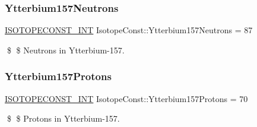 \subsubsection{\texorpdfstring{Ytterbium157\+Neutrons}{Ytterbium157Neutrons}}
{\footnotesize\ttfamily \mbox{\hyperlink{group___isotope_const-_macros_ga5f18360b3e99483a35c32d789e62621c}{I\+S\+O\+T\+O\+P\+E\+C\+O\+N\+S\+T\+\_\+\+I\+NT}} Isotope\+Const\+::\+Ytterbium157\+Neutrons = 87}

\$ \$ Neutrons in Ytterbium-\/157. \mbox{\label{group___isotope_const-_ytterbium-_yb157_ga85c7cca72b2035565322da9c07930e69}} 
\subsubsection{\texorpdfstring{Ytterbium157\+Protons}{Ytterbium157Protons}}
{\footnotesize\ttfamily \mbox{\hyperlink{group___isotope_const-_macros_ga5f18360b3e99483a35c32d789e62621c}{I\+S\+O\+T\+O\+P\+E\+C\+O\+N\+S\+T\+\_\+\+I\+NT}} Isotope\+Const\+::\+Ytterbium157\+Protons = 70}

\$ \$ Protons in Ytterbium-\/157. 